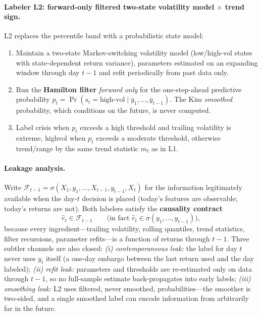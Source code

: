 \paragraph{Labeler L2: forward-only filtered two-state volatility model
$\times$ trend sign.}
L2 replaces the percentile band with a probabilistic state model:
\begin{enumerate}
  \item Maintain a two-state Markov-switching volatility model (low/high-vol
        states with state-dependent return variance), parameters estimated
        on an expanding window through day $t-1$ and refit periodically from
        past data only.
  \item Run the \textbf{Hamilton filter} \citep{hamilton1989new}
        \emph{forward only} for the one-step-ahead predictive probability
        $p_t = \Pr(s_t = \text{high-vol} \mid \bar y_1, \ldots, \bar y_{t-1})$.
        The Kim \emph{smoothed} probability, which conditions on the future,
        is never computed.
  \item Label \textsf{crisis} when $p_t$ exceeds a high threshold and
        trailing volatility is extreme, \textsf{highvol} when $p_t$ exceeds
        a moderate threshold, otherwise \textsf{trend}/\textsf{range} by the
        same trend statistic $m_t$ as in L1.
\end{enumerate}

\paragraph{Leakage analysis.}
Write $\mathcal{F}_{t-1} = \sigma(X_1, y_1, \ldots, X_{t-1}, y_{t-1}, X_t)$
for the information legitimately available when the day-$t$ decision is
placed (today's features are observable; today's returns are not). Both
labelers satisfy the \textbf{causality contract}
\begin{equation}
\label{eq:dd2-causal}
\hat r_t \in \mathcal{F}_{t-1}
\qquad \text{(in fact } \hat r_t \in \sigma(y_1, \ldots, y_{t-1})\text{)},
\end{equation}
because every ingredient---trailing volatility, rolling quantiles, trend
statistics, filter recursions, parameter refits---is a function of returns
through $t-1$. Three subtler channels are also closed:
\emph{(i) contemporaneous leak:} the label for day $t$ never uses $y_t$
itself (a one-day embargo between the last return used and the day labeled);
\emph{(ii) refit leak:} parameters and thresholds are re-estimated only on
data through $t-1$, so no full-sample estimate back-propagates into early
labels;
\emph{(iii) smoothing leak:} L2 uses filtered, never smoothed,
probabilities---the smoother is two-sided, and a single smoothed label can
encode information from arbitrarily far in the future.

